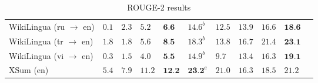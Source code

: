 \documentclass{article}
\begin{document}
\begin{table}[t!]
\begin{tabular}{p{3.5cm}llllllllll}
    WikiLingua (ru $\rightarrow$ en) & $0.1$ & $2.3$ & $5.2$ & $\textbf{6.6}$ & $14.6^b$ & $12.5$ & $13.9$ & $16.6$ & $\textbf{18.6}$ \\
    WikiLingua (tr $\rightarrow$ en) & $1.8$ & $1.8$ & $5.6$ & $\textbf{8.5}$ & $18.3^b$ & $13.8$ & $16.7$ & $21.4$ & $\textbf{23.1}$ \\
    WikiLingua (vi $\rightarrow$ en) & $0.3$ & $1.5$ & $4.0$ & $\textbf{5.5}$ & $14.9^b$ & $9.7$ & $13.4$ & $16.3$ & $\textbf{19.1}$ \\
    XSum (en) & $5.4$ & $7.9$ & $11.2$ & $\textbf{12.2}$ & $\textbf{23.2}^e$ & $21.0$ & $16.3$ & $18.5$ & $21.2$ \\
    \bottomrule
    \end{tabular}
    \caption{ROUGE-2 results}
    
    \label{tab:gem-br540B-table}
\end{table}
\end{document}
